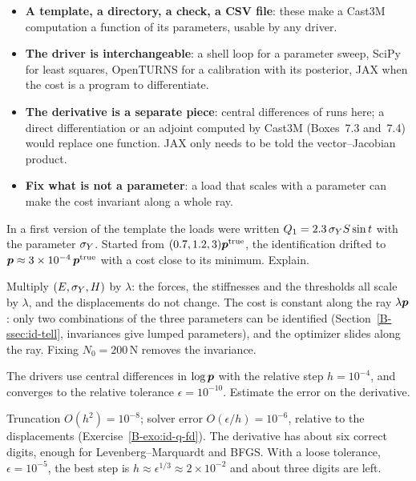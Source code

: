 
\begin{gbox*}
\begin{itemize}
\item \textbf{A template, a directory, a check, a CSV file}: these make a
  Cast3M computation a function of its parameters, usable by any driver.
\item \textbf{The driver is interchangeable}: a shell loop for a parameter
  sweep, SciPy for least squares, OpenTURNS for a calibration with its
  posterior, JAX when the cost is a program to differentiate.
\item \textbf{The derivative is a separate piece}: central differences of
  runs here; a direct differentiation or an adjoint computed by Cast3M
  (Boxes~7.3 and~7.4) would replace one function. JAX only needs to be told the
  vector--Jacobian product.
\item \textbf{Fix what is not a parameter}: a load that scales with a
  parameter can make the cost invariant along a whole ray.
\end{itemize}
\end{gbox*}



\label{exo:cc-id-q-scale}
%
In a first version of the template the loads were written
$Q_1=2.3\,\sigma_{Y} S\sin t$ with the parameter $\sigma_{Y}$. Started from
$(0.7,1.2,3)\bm{p}^{\mathrm{true}}$, the identification drifted to
$\bm{p}\approx3\times10^{-4}\,\bm{p}^{\mathrm{true}}$ with a cost close to its
minimum. Explain.
\begin{solution}
Multiply $(E,\sigma_{Y},H)$ by $\lambda$: the forces, the stiffnesses and the
thresholds all scale by $\lambda$, and the displacements do not change. The cost
is constant along the ray $\lambda\bm{p}$: only two combinations of the three
parameters can be identified (Section~\ref{B-ssec:id-tell}, invariances give
lumped parameters), and the optimizer slides along the ray. Fixing $N_0=200$\,N
removes the invariance.
\end{solution}

\label{exo:cc-id-q-step}
%
The drivers use central differences in $\log\bm{p}$ with the relative step
$h=10^{-4}$, and  converges to the relative tolerance
$\epsilon=10^{-10}$. Estimate the error on the derivative.
\begin{solution}
Truncation $O(h^2)=10^{-8}$; solver error $O(\epsilon/h)=10^{-6}$, relative
to the displacements (Exercise~\ref{B-exo:id-q-fd}). The derivative has about
six correct digits, enough for Levenberg--Marquardt and BFGS. With a loose
tolerance, $\epsilon=10^{-5}$, the best step is $h\approx\epsilon^{1/3}\approx
2\times10^{-2}$ and about three digits are left.
\end{solution}


